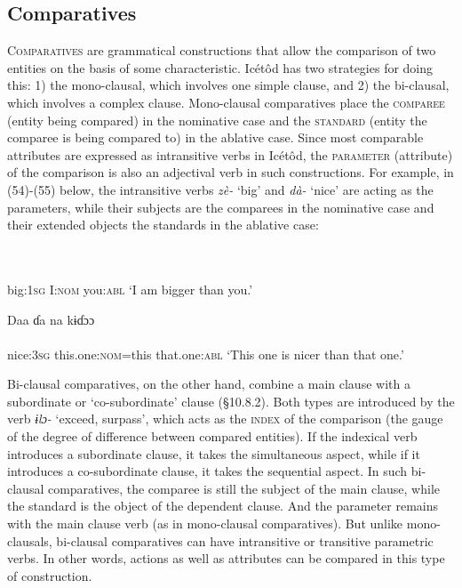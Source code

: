 \subsection{Comparatives}


\textsc{Comparatives} are grammatical constructions that allow the comparison of two entities on the basis of some characteristic. Icétôd has two strategies for doing this: 1) the mono-clausal, which involves one simple clause, and 2) the bi-clausal, which involves a complex clause. Mono-clausal comparatives place the \textsc{comparee} (entity being compared) in the nominative case and the \textsc{standard} (entity the comparee is being compared to) in the ablative case. Since most comparable attributes are expressed as intransitive verbs in Icétôd, the \textsc{parameter} (attribute) of the comparison is also an adjectival verb in such constructions. For example, in (54)-(55) below, the intransitive verbs \textit{zè-} ‘big’ and \textit{dà-} ‘nice’ are acting as the parameters, while their subjects are the comparees in the nominative case and their extended objects the standards in the ablative case:




\ea\label{ex:}
 \\
    \\
big:\textsc{1sg}   I:\textsc{nom}   you:\textsc{abl}
\glt ‘I am bigger than you.’ 
\z




\ea\label{ex:}
\gll Daa     ɗa na       kɨɗɔɔ \\
    \\
nice:\textsc{3sg}   this.one:\textsc{nom}=this   that.one:\textsc{abl}
\glt ‘This one is nicer than that one.’ 
\z


Bi-clausal comparatives, on the other hand, combine a main clause with a subordinate or ‘co-subordinate’ clause (§10.8.2). Both types are introduced by the verb \textit{ɨlɔ-} ‘exceed, surpass’, which acts as the \textsc{index} of the comparison (the gauge of the degree of difference between compared entities). If the indexical verb introduces a subordinate clause, it takes the simultaneous aspect, while if it introduces a co-subordinate clause, it takes the sequential aspect. In such bi-clausal comparatives, the comparee is still the subject of the main clause, while the standard is the object of the dependent clause. And the parameter remains with the main clause verb (as in mono-clausal comparatives). But unlike mono-clausals, bi-clausal comparatives can have intransitive or transitive parametric verbs. In other words, actions as well as attributes can be compared in this type of construction.

